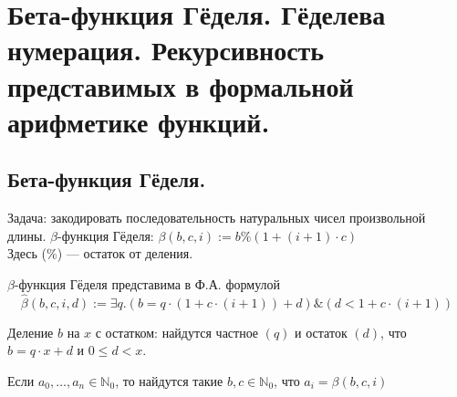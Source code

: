 \documentclass[10pt,a4paper,oneside]{article}
\begin{document}
\section{Бета-функция Гёделя. 
Гёделева нумерация. Рекурсивность представимых в формальной арифметике функций.}

\subsection{Бета-функция Гёделя.}
Задача: закодировать последовательность натуральных чисел произвольной длины.
 $\beta$-функция Гёделя: $\mathcal{\beta}(b,c,i) := b \% (1 + (i+1) \cdot c)$\\
Здесь (\%) --- остаток от деления.

 $\beta$-функция Гёделя представима в Ф.А. формулой
$$\hat{\beta}(b,c,i,d) := \exists q.(b = q \cdot (1 + c \cdot (i+1)) + d) \& (d < 1 + c \cdot (i+1))$$

Деление $b$ на $x$ с остатком: найдутся частное $(q)$ и остаток $(d)$, что
$b = q\cdot x + d$ и $0 \le d < x$.

 Если $a_0, \dots, a_n \in \mathbb{N}_0$, то найдутся такие $b,c \in \mathbb{N}_0$, что
$a_i = \beta(b,c,i)$
\end{document}
